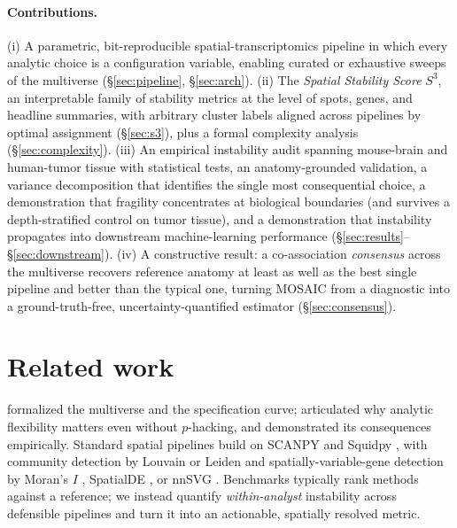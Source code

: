 \paragraph{Contributions.} (i) A parametric, bit-reproducible spatial-transcriptomics
pipeline in which every analytic choice is a configuration variable, enabling curated or
exhaustive sweeps of the multiverse (\S\ref{sec:pipeline}, \S\ref{sec:arch}). (ii) The
\emph{Spatial Stability Score} $S^3$, an interpretable family of stability metrics at the
level of spots, genes, and headline summaries, with arbitrary cluster labels aligned across
pipelines by optimal assignment (\S\ref{sec:s3}), plus a formal complexity analysis
(\S\ref{sec:complexity}). (iii) An empirical instability audit spanning mouse-brain and
human-tumor tissue with statistical tests, an anatomy-grounded validation, a variance
decomposition that identifies the single most consequential choice, a demonstration that
fragility concentrates at biological boundaries (and survives a depth-stratified control on
tumor tissue), and a demonstration that instability
propagates into downstream machine-learning performance (\S\ref{sec:results}--%
\S\ref{sec:downstream}). (iv) A constructive result: a co-association \emph{consensus} across
the multiverse recovers reference anatomy at least as well as the best single pipeline and
better than the typical one, turning MOSAIC from a diagnostic into a ground-truth-free,
uncertainty-quantified estimator (\S\ref{sec:consensus}).

\section{Related work}
\citet{steegen2016increasing} formalized the multiverse and \citet{simonsohn2020specification}
the specification curve; \citet{gelman2013garden} articulated why analytic flexibility
matters even without $p$-hacking, and \citet{botvinik2020variability} demonstrated its
consequences empirically. Standard spatial pipelines build on SCANPY
\citep{wolf2018scanpy} and Squidpy \citep{palla2022squidpy}, with community detection by
Louvain \citep{blondel2008fast} or Leiden \citep{traag2019louvain} and spatially-variable-gene
detection by Moran's $I$ \citep{moran1950notes}, SpatialDE \citep{svensson2018spatialde}, or
nnSVG \citep{weber2023nnsvg}. Benchmarks typically rank methods against a reference; we
instead quantify \emph{within-analyst} instability across defensible pipelines and turn it
into an actionable, spatially resolved metric.

